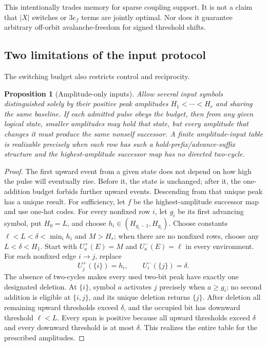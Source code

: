 \documentclass[12pt,letterpaper]{article}
\newtheorem{proposition}[theorem]{Proposition}
\theoremstyle{definition}\newtheorem{definition}[theorem]{Definition}
\theoremstyle{remark}\newtheorem{remark}[theorem]{Remark}
\begin{document}
This intentionally trades memory for sparse coupling support. It is not a claim that $|X|$ switches or $3e_f$ terms are jointly optimal. Nor does it guarantee arbitrary off-orbit avalanche-freedom for signed threshold shifts.

\subsection{Two limitations of the input protocol}
The switching budget also restricts control and reciprocity.

\begin{proposition}[Amplitude-only inputs]\label{prop:amplitude}
Allow several input symbols distinguished solely by their positive peak amplitudes $H_1<\cdots<H_r$ and sharing the same baseline. If each admitted pulse obeys the budget, then from any given logical state, smaller amplitudes may hold that state, but every amplitude that changes it must produce the \emph{same} nonself successor. A finite amplitude-input table is realizable precisely when each row has such a hold-prefix/advance-suffix structure and the highest-amplitude successor map has no directed two-cycle.
\end{proposition}
\begin{proof}
The first upward event from a given state does not depend on how high the pulse will eventually rise. Before it, the state is unchanged; after it, the one-addition budget forbids further upward events. Descending from that unique peak has a unique result. For sufficiency, let $f$ be the highest-amplitude successor map and use one-hot codes. For every nonfixed row $i$, let $g_i$ be its first advancing symbol, put $H_0=L$, and choose $h_i\in(H_{g_i-1},H_{g_i})$. Choose constants $\ell<L<\delta<\min_i h_i$ and $M>H_r$; when there are no nonfixed rows, choose any $L<\delta<H_1$. Start with $U_a^+(E)=M$ and $U_a^-(E)=\ell$ in every environment. For each nonfixed edge $i\to j$, replace
\[
 U_j^+(\{i\})=h_i,\qquad U_i^-(\{j\})=\delta.
\]
The absence of two-cycles makes every used two-bit peak have exactly one designated deletion. At $\{i\}$, symbol $a$ activates $j$ precisely when $a\ge g_i$; no second addition is eligible at $\{i,j\}$, and its unique deletion returns $\{j\}$. After deletion all remaining upward thresholds exceed $\delta$, and the occupied bit has downward threshold $\ell<L$. Every span is positive because all upward thresholds exceed $\delta$ and every downward threshold is at most $\delta$. This realizes the entire table for the prescribed amplitudes.
\end{proof}
\end{document}
